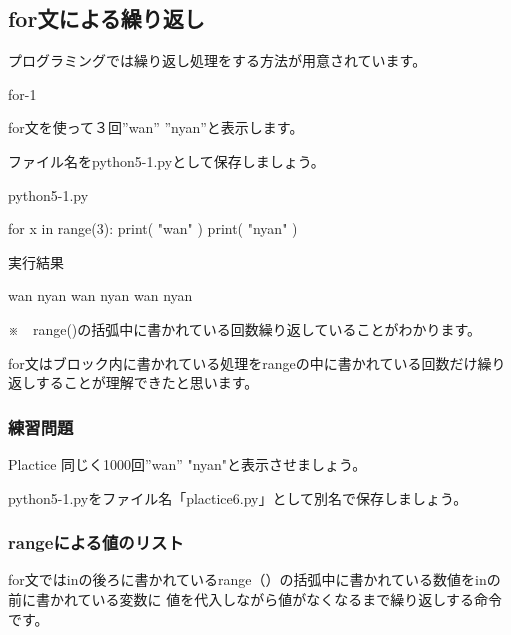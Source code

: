 \documentclass[11pt,a4paper,dvipdfmx,titlepage]{jsreport}
\begin{document}
\subsection{for文による繰り返し}
プログラミングでは繰り返し処理をする方法が用意されています。



\begin{pabox}{for-1}

for文を使って３回”wan” ”nyan”と表示します。

ファイル名をpython5-1.pyとして保存しましょう。
\begin{legbox}{python5-1.py}
\begin{listing}{1}
for x in range(3):
    print( "wan" )
    print( "nyan" )
\end{listing}
実行結果
\begin{listing}{1}
wan
nyan
wan
nyan
wan
nyan
\end{listing}
\end{legbox}


※　range()の括弧中に書かれている回数繰り返していることがわかります。
\end{pabox}

for文はブロック内に書かれている処理をrangeの中に書かれている回数だけ繰り返しすることが理解できたと思います。
\subsubsection{練習問題}
\begin{plabox}{Plactice}
同じく1000回”wan” "nyan"と表示させましょう。

python5-1.pyをファイル名「plactice6.py」として別名で保存しましょう。

\end{plabox}




\subsubsection{rangeによる値のリスト}
for文ではinの後ろに書かれているrange（）の括弧中に書かれている数値をinの前に書かれている変数に
値を代入しながら値がなくなるまで繰り返しする命令です。
\end{document}
